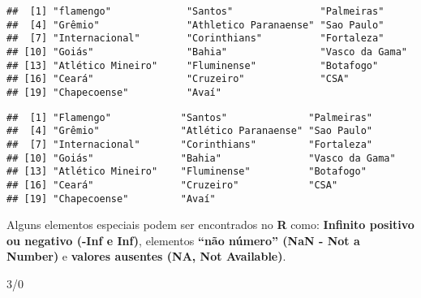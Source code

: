 \documentclass[
]{book}
\newenvironment{Shaded}{\begin{snugshade}}{\end{snugshade}}
\newcommand{\CommentTok}[1]{\textcolor[rgb]{0.56,0.35,0.01}{\textit{#1}}}
\newcommand{\DecValTok}[1]{\textcolor[rgb]{0.00,0.00,0.81}{#1}}
\newcommand{\FloatTok}[1]{\textcolor[rgb]{0.00,0.00,0.81}{#1}}
\newcommand{\FunctionTok}[1]{\textcolor[rgb]{0.00,0.00,0.00}{#1}}
\newcommand{\NormalTok}[1]{#1}
\newcommand{\SpecialCharTok}[1]{\textcolor[rgb]{0.00,0.00,0.00}{#1}}
\newcommand{\StringTok}[1]{\textcolor[rgb]{0.31,0.60,0.02}{#1}}
\begin{document}
\begin{Shaded}
\end{Shaded}

\begin{verbatim}
##  [1] "flamengo"             "Santos"               "Palmeiras"           
##  [4] "Grêmio"               "Athletico Paranaense" "Sao Paulo"           
##  [7] "Internacional"        "Corinthians"          "Fortaleza"           
## [10] "Goiás"                "Bahia"                "Vasco da Gama"       
## [13] "Atlético Mineiro"     "Fluminense"           "Botafogo"            
## [16] "Ceará"                "Cruzeiro"             "CSA"                 
## [19] "Chapecoense"          "Avaí"
\end{verbatim}

\begin{Shaded}
\end{Shaded}

\begin{verbatim}
##  [1] "Flamengo"            "Santos"              "Palmeiras"          
##  [4] "Grêmio"              "Atlético Paranaense" "Sao Paulo"          
##  [7] "Internacional"       "Corinthians"         "Fortaleza"          
## [10] "Goiás"               "Bahia"               "Vasco da Gama"      
## [13] "Atlético Mineiro"    "Fluminense"          "Botafogo"           
## [16] "Ceará"               "Cruzeiro"            "CSA"                
## [19] "Chapecoense"         "Avaí"
\end{verbatim}

Alguns elementos especiais podem ser encontrados no \textbf{R} como: \textbf{Infinito positivo ou negativo (-Inf e Inf)}, elementos \textbf{``não número'' (NaN - Not a Number)} e \textbf{valores ausentes (NA, Not Available)}.

\begin{Shaded}
\begin{Highlighting}[]
\DecValTok{3}\SpecialCharTok{/}\DecValTok{0}
\end{Highlighting}
\end{Shaded}
\end{document}
